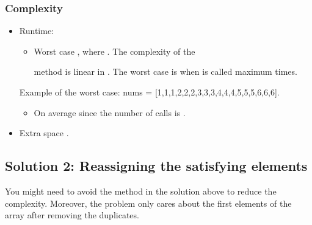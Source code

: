 \documentclass[letterpaper,12pt,english]{book}
\begin{document}
\subsubsection{Complexity}
\label{\detokenize{Sorting/04_SORT_80_Remove_Duplicates_from_Sorted_Array:complexity}}\begin{itemize}
\item {} 
\sphinxAtStartPar
Runtime:
\begin{itemize}
\item {} 
\sphinxAtStartPar
Worst case , where . The complexity of the %
\begin{footnote}[89]\sphinxAtStartFootnote
{}
%
\end{footnote} method is linear in . The worst case is when  is called maximum  times.

\end{itemize}

\begin{sphinxVerbatim}[commandchars=\\\{\}]
Example of the worst case:
nums = [1,1,1,2,2,2,3,3,3,4,4,4,5,5,5,6,6,6].
\end{sphinxVerbatim}
\begin{itemize}
\item {} 
\sphinxAtStartPar
On average  since the number of  calls is .

\end{itemize}

\item {} 
\sphinxAtStartPar
Extra space .

\end{itemize}


\subsection{Solution 2: Reassigning the satisfying elements}
\label{\detokenize{Sorting/04_SORT_80_Remove_Duplicates_from_Sorted_Array:solution-2-reassigning-the-satisfying-elements}}
\sphinxAtStartPar
You might need to avoid the  method in the solution above to reduce the complexity. Moreover, the problem only cares about the first  elements of the array  after removing the duplicates.
\end{document}

